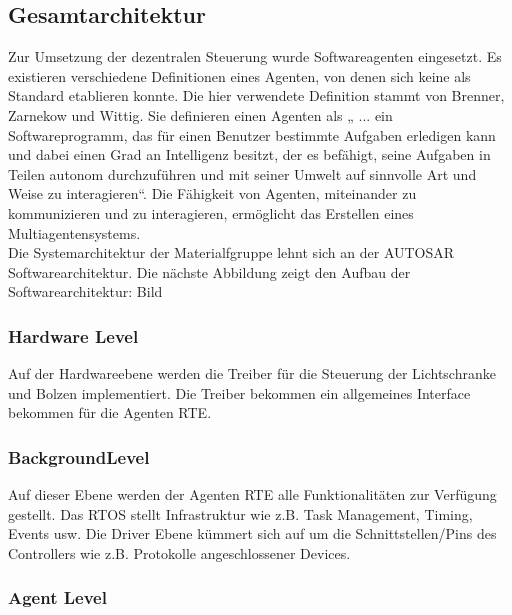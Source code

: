 \subsection{Gesamtarchitektur}
Zur Umsetzung der dezentralen Steuerung wurde Softwareagenten eingesetzt. Es existieren verschiedene Definitionen eines Agenten, von denen
sich keine als Standard etablieren konnte. Die hier verwendete Definition stammt von
Brenner, Zarnekow und Wittig. Sie definieren einen Agenten als „ ... ein Softwareprogramm,
das für einen Benutzer bestimmte Aufgaben erledigen kann und dabei einen Grad an
Intelligenz besitzt, der es befähigt, seine Aufgaben in Teilen autonom durchzuführen und mit
seiner Umwelt auf sinnvolle Art und Weise zu interagieren“\cite{BZW98}. Die Fähigkeit von Agenten, miteinander zu kommunizieren 
und zu interagieren, ermöglicht das Erstellen eines Multiagentensystems.\\
Die Systemarchitektur der Materialfgruppe lehnt sich an der AUTOSAR Softwarearchitektur. Die nächste Abbildung zeigt den 
Aufbau der Softwarearchitektur: Bild
\subsubsection{Hardware Level}
Auf der Hardwareebene werden die Treiber für die Steuerung der Lichtschranke und Bolzen implementiert. Die Treiber bekommen ein
allgemeines Interface bekommen für die Agenten RTE.
\subsubsection{BackgroundLevel}
Auf dieser Ebene werden der Agenten RTE alle Funktionalitäten zur Verfügung gestellt. Das RTOS stellt Infrastruktur wie z.B. Task Management, 
Timing, Events usw. Die Driver Ebene kümmert sich auf um die Schnittstellen/Pins des Controllers wie z.B. Protokolle angeschlossener
Devices\cite[S. 26]{Stasch:Hahn}. 

\subsubsection{Agent Level}


